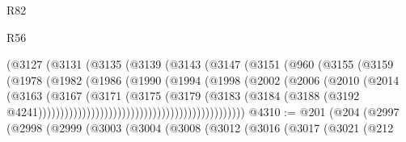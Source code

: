 \begin{lexlean}{R82}
\begin{lexlean}{R56}
\begin{coremodule}
{{{{{{{{{{{{{{{{{{{{{{{{{{{{{{{{{{{{{{{{{{{{{{{{{{{{{{{{{{{{{{{{{{{{{{{{{{{{{{{{{{{{{{{{{{{{{{{{{{{{{{{{{{{{{{{{{{{{{{{{{{{{{{{{{{{{{{{{{{{{{{{{{{{{{{{{{{{{{{{{{{{{{{{{{{{{{{{{{{{{{{{{{{{{{{{{{{{{{{{{{{{{{{{{{{{                                        (@3127
                                          (@3131
                                            (@3135
                                              (@3139
                                                (@3143
                                                  (@3147
                                                    (@3151
                                                      (@960
                                                        (@3155
                                                          (@3159
                                                            (@1978
                                                              (@1982
                                                                (@1986
                                                                  (@1990
                                                                    (@1994
                                                                      (@1998
                                                                        (@2002
                                                                          (@2006
                                                                            (@2010
                                                                              (@2014
                                                                                (@3163
                                                                                  (@3167
                                                                                    (@3171
                                                                                      (@3175
                                                                                        (@3179
                                                                                          (@3183
                                                                                            (@3184
                                                                                              (@3188
                                                                                                (@3192
                                                                                                  @4241)))))))))))))))))))))))))))))))))))))))))))))))
@4310 := @201
    (@204
      (@2997
        (@2998
          (@2999
            (@3003
              (@3004
                (@3008
                  (@3012
                    (@3016
                      (@3017
                        (@3021
                          (@212
}}}}}}}}}}}}}}}}}}}}}}}}}}}}}}}}}}}}}}}}}}}}}}}}}}}}}}}}}}}}}}}}}}}}}}}}}}}}}}}}}}}}}}}}}}}}}}}}}}}}}}}}}}}}}}}}}}}}}}}}}}}}}}}}}}}}}}}}}}}}}}}}}}}}}}}}}}}}}}}}}}}}}}}}}}}}}}}}}}}}}}}}}}}}}}}}}}}}}}}}}}}}}}}}}}}
\end{coremodule}
\end{lexlean}
\end{lexlean}
